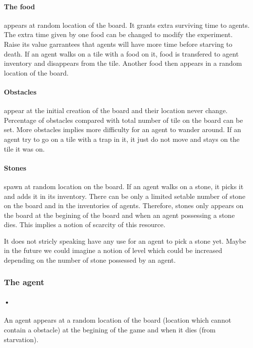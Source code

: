 \documentclass{article}
\begin{document}
\paragraph{The food}
appears at random location of the board. It grants extra surviving time to agents. The extra time given by one food can be changed to modify the experiment. Raise its value garrantees that agents will have more time before starving to death. If an agent walks on a tile with a food on it, food is transfered to agent inventory and disappears from the tile. Another food then appears in a random location of the board.

\paragraph{Obstacles}
appear at the initial creation of the board and their location never change. Percentage of obstacles compared with total number of tile on the board can be set. More obstacles implies more difficulty for an agent to wander around. If an agent try to go on a tile with a trap in it, it just do not move and stays on the tile it was on.

\paragraph{Stones}
spawn at random location on the board. If an agent walks on a stone, it picks it and adds it in its inventory. There can be only a limited setable number of stone on the board and in the inventories of agents. Therefore, stones only appears on the board at the begining of the board and when an agent possessing a stone dies. This implies a notion of scarcity of this resource. \par
It does not stricly speaking have any use for an agent to pick a stone yet. Maybe in the future we could imagine a notion of level which could be increased depending on the number of stone possessed by an agent.

\subsubsection{The agent}

\paragraph{•}
An agent appears at a random location of the board (location which cannot contain a obstacle) at the begining of the game and when it dies (from starvation). \par
\end{document}

